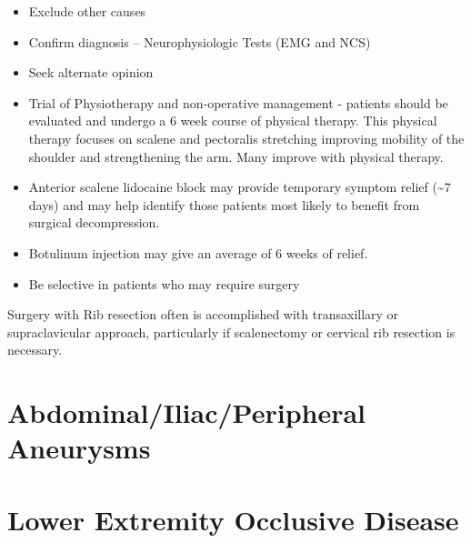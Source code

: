 \documentclass[
]{book}
\begin{document}
\begin{itemize}
\item
  Exclude other causes
\item
  Confirm diagnosis -- Neurophysiologic Tests (EMG and NCS)
\item
  Seek alternate opinion
\item
  Trial of Physiotherapy and non-operative management - patients
  should be evaluated and undergo a 6 week course of physical therapy.
  This physical therapy focuses on scalene and pectoralis stretching
  improving mobility of the shoulder and strengthening the arm. Many
  improve with physical therapy.
  \citep{baldermanPhysicalTherapyManagement2019}
\item
  Anterior scalene lidocaine block may provide temporary symptom
  relief (\textasciitilde7 days) and may help identify those patients most likely
  to benefit from surgical decompression.
  \citep{salhanPC214UltrasoundGuidedAnesthetic2016, lumImpactAnteriorScalene2012}
\item
  Botulinum injection may give an average of 6 weeks of relief.
  \citep{salhanPC214UltrasoundGuidedAnesthetic2016}
\item
  Be selective in patients who may require surgery
\end{itemize}

Surgery with Rib resection often is accomplished with transaxillary or
supraclavicular approach, particularly if scalenectomy or cervical rib
resection is necessary.

\hypertarget{abdominaliliacperipheral-aneurysms}{%
\chapter{Abdominal/Iliac/Peripheral Aneurysms}\label{abdominaliliacperipheral-aneurysms}}

\hypertarget{section}{%
\section{}\label{section}}

\hypertarget{lower-extremity-occlusive-disease}{%
\chapter{Lower Extremity Occlusive Disease}\label{lower-extremity-occlusive-disease}}

\hypertarget{section-1}{%
\section{}\label{section-1}}
\end{document}
